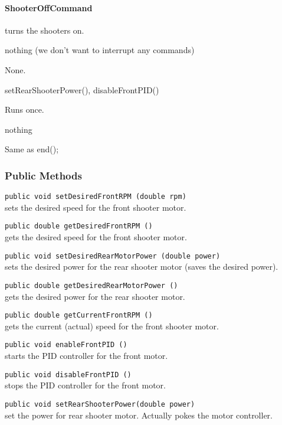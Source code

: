 \documentclass[]{article}
\begin{document}
\paragraph{ShooterOffCommand} turns the shooters on.
\begin{description}[topsep=0ex]
\item[requires] nothing (we don't want to interrupt any commands)
\item[initialization]  None.
\item[execute] setRearShooterPower(), disableFrontPID()
\item[isDone] Runs once.
\item[end] nothing
\item[interrupted] Same as end();
\end{description}

\subsubsection{Public Methods}

\noindent
\lstinline[]|public void setDesiredFrontRPM (double rpm)| \\
sets the desired speed for the front shooter motor.

\noindent
\lstinline[]|public double getDesiredFrontRPM ()| \\
gets the desired speed for the front shooter motor.

\noindent
\lstinline[]|public void setDesiredRearMotorPower (double power)| \\
sets the desired power for the rear shooter motor (saves the desired power).

\noindent
\lstinline[]|public double getDesiredRearMotorPower ()| \\
gets the desired power for the rear shooter motor.

\noindent
\lstinline[]|public double getCurrentFrontRPM ()| \\
gets the current (actual) speed for the front shooter motor.

\noindent
\lstinline[]|public void enableFrontPID ()| \\
starts the PID controller for the front motor.

\noindent
\lstinline[]|public void disableFrontPID ()| \\
stops the PID controller for the front motor.

\noindent
\lstinline[]|public void setRearShooterPower(double power)| \\
set the power for rear shooter motor. Actually pokes the motor controller.
\end{document}
